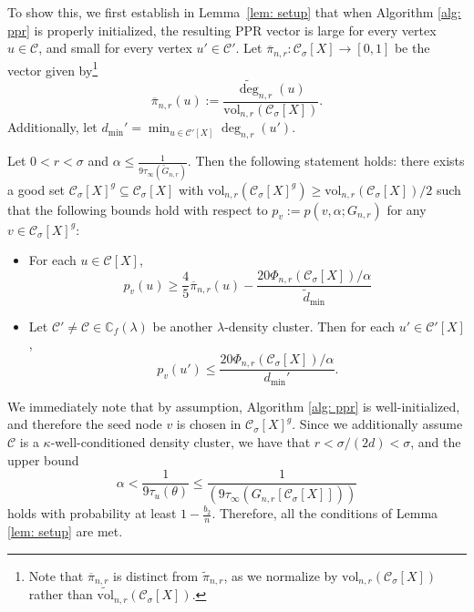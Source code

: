 \documentclass[11pt,twoside]{article}
\newcommand{\vol}{\mathrm{vol}}
\newcommand{\1}{\mathbbm{1}}
\newcommand{\taubf}{\tau_{u}}
\newcommand{\pbf}{p}        %
\newcommand{\pibf}{\pi}
\newcommand{\Xbf}{X}
\newcommand{\Cbb}{\mathbb{C}}
\newcommand{\Cset}{\mathcal{C}}
\newcommand{\Csig}{\Cset_{\sigma}}
\newcommand{\degminpr}{d_{\min}'}
\newcommand{\degminwt}{\widetilde{d}_{\min}}
\begin{document}
To show this, we first establish in Lemma~\ref{lem: setup} that when Algorithm \ref{alg: ppr} is properly initialized, the resulting PPR vector is large for every vertex $u \in \Cset$, and small for every vertex $u' \in \Cset'$. Let $\overline{\pibf}_{n,r}: \Csig[\Xbf] \to [0,1]$ be the vector given by\footnote{Note that $\overline{\pibf}_{n,r}$ is distinct from $\widetilde{\pibf}_{n,r}$, as we normalize by $\vol_{n,r}(\Csig[\Xbf])$ rather than $\widetilde{\vol}_{n,r}(\Csig[\Xbf])$.} 
\begin{equation*}
\overline{\pibf}_{n,r}(u) := \frac{\widetilde{\deg}_{n,r}(u)}{\vol_{n,r}(\Csig[\Xbf])}.
\end{equation*} Additionally, let $\degminpr = \min_{u \in \Cset'[\Xbf]} \deg_{n,r}(u')$. 

\begin{lemma} 
	\label{lem: setup}
	Let $0 < r < \sigma$ and $\alpha \leq \frac{1}{9 \tau_{\infty}(\widetilde{G}_{n,r})}$. Then the following statement holds: there exists a good set $\Csig[\Xbf]^g \subseteq \Csig[\Xbf]$ with $\vol_{n,r}(\Csig[\Xbf]^g) \geq \vol_{n,r}(\Csig[\Xbf])/2$ such that the following bounds hold with respect to $\pbf_v := \pbf(v,\alpha;G_{n,r})$ for any $v \in \Csig[\Xbf]^g$:
	\begin{itemize}
		\item For each $u \in \Cset[\Xbf]$,
		\begin{equation}
		\label{eqn: lower_bound_PPR_in_cluster}
		\pbf_v(u) \geq \frac{4}{5} \overline{\pibf}_{n,r}(u) - \frac{20 \Phi_{n,r}(\Csig[\Xbf])/\alpha}{\degminwt}
		\end{equation}
		\item Let $\Cset' \neq \Cset \in \Cbb_f(\lambda)$ be another $\lambda$-density cluster. Then for each $u' \in \Cset'[\Xbf]$,
		\begin{equation}
		\label{eqn: upper_bound_PPR_in_other_cluster}
		\pbf_v(u') \leq \frac{20 \Phi_{n,r}(\Csig[\Xbf])/\alpha}{\degminpr}.
		\end{equation}
	\end{itemize}
\end{lemma}

We immediately note that by assumption, Algorithm \ref{alg: ppr} is well-initialized, and therefore the seed node $v$ is chosen in $\Csig[\Xbf]^g$. Since we additionally assume $\Cset$ is a $\kappa$-well-conditioned density cluster, we have that $r < \sigma/(2d) < \sigma$, and the upper bound 
\begin{equation*}
\alpha < \frac{1}{9\taubf(\theta)} \leq \frac{1}{(9 \tau_{\infty}(G_{n,r}[\Csig[\Xbf]]))}
\end{equation*}
holds with probability at least $1 - \frac{b_2}{n}$.
Therefore, all the conditions of Lemma \ref{lem: setup} are met. 
\end{document}
